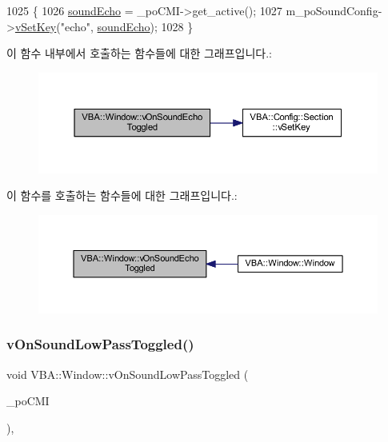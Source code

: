 \begin{DoxyCode}
1025 \{
1026   \mbox{\hyperlink{gb_sound_8cpp_a687b8b28b681969302cdf6e804bcf8db}{soundEcho}} = \_poCMI->get\_active();
1027   m\_poSoundConfig->\mbox{\hyperlink{class_v_b_a_1_1_config_1_1_section_a57e1b95cbea40db71c093381beff4b0e}{vSetKey}}(\textcolor{stringliteral}{"echo"}, \mbox{\hyperlink{gb_sound_8cpp_a687b8b28b681969302cdf6e804bcf8db}{soundEcho}});
1028 \}
\end{DoxyCode}
이 함수 내부에서 호출하는 함수들에 대한 그래프입니다.\+:
\nopagebreak
\begin{figure}[H]
\begin{center}
\leavevmode
\includegraphics[width=350pt]{class_v_b_a_1_1_window_acf58efc519acc8f3fd42b0e3481eff23_cgraph}
\end{center}
\end{figure}
이 함수를 호출하는 함수들에 대한 그래프입니다.\+:
\nopagebreak
\begin{figure}[H]
\begin{center}
\leavevmode
\includegraphics[width=350pt]{class_v_b_a_1_1_window_acf58efc519acc8f3fd42b0e3481eff23_icgraph}
\end{center}
\end{figure}
\mbox{\label{class_v_b_a_1_1_window_a424a694cc0b0e3cb750ed07457b2b11e}} 
\subsubsection{\texorpdfstring{v\+On\+Sound\+Low\+Pass\+Toggled()}{vOnSoundLowPassToggled()}}
{\footnotesize\ttfamily void V\+B\+A\+::\+Window\+::v\+On\+Sound\+Low\+Pass\+Toggled (\begin{DoxyParamCaption}\item[{Gtk\+::\+Check\+Menu\+Item $\ast$}]{\+\_\+po\+C\+MI }\end{DoxyParamCaption})\hspace{0.3cm}{\ttfamily [protected]}, {\ttfamily [virtual]}}



